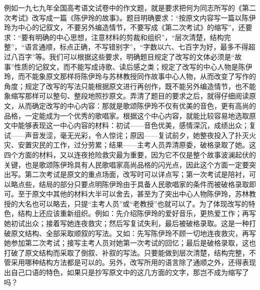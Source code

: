 例如一九七九年全国高考语文试卷中的作文题，就是要求把何为同志所写的《第二次考试》改写成一篇《陈伊玲的故事》。题目明确要求：“按原文内容写一篇以陈伊玲为中心的记叙文，不要另外编造情节，不要写成《第二次考试》的缩写”，还要求：“要有明确的中心思想，注意材料的剪裁和组织”，“层次清楚，结构完整”，“语言通顺，标点正确，不写错别字”，“字数以六、七百字为好，最多不得超过八百字”等。我们可以根据这些要求，明确题目规定了改写的文体必须是“故事”性质的记叙文，而不能写成诗歌、读后感之类；规定了改写的中心人物是陈伊玲，而不能象原文那样将陈伊玲与苏林教授同作故事中心人物，从而改变了写作的角度；规定了改写的写法只能根据原文进行再创作，既不能另外编造情节，也不能象缩写那样可以整句、整段地照抄原文。弄清了题目的要求之后，就得仔细阅读原文，从而确定改写的中心内容：那就是歌颂陈伊玲不仅有优美的音色，更有高尚的品格，一定能成为一个优秀的歌唱家。根据这个中心内容，就能比较容易地选取原文中能够表现这一中心内容的材料：初试——音色优美，感情深沉，成绩出众；复试——声音发涩，毫无光彩，令人惊诧；原因——复试前夕，她整夜投入了扑灭火灾、安置灾民的工作，过分劳累；结果——主考人员弄清原委，破格录取了她。这四个方面的材料，又以连夜抢险救灾最为重要，因为它不仅是整个故事波澜起伏的关键，也是歌颂陈伊玲具有人民歌唱家高尚品格的闪光点，因此这个方面一定要突出写。第二次考试是原文的重点场面，改写时可以详点写；第一次考试是陪衬，可以略点些，结局的部分只要点明陈伊玲由于具备人民歌唱家的条件而被破格录取即可。至于原文中其他的材料大半可以舍去，甚至为了突出中心人物陈伊玲，苏林教授的大名也可以略去，只提“主考人员”或“老教授”也就可以了。为了体现改写的特色，结构上还应该重新组织。例如：先介绍陈伊玲的爱好音乐，更热爱工作；再写她初试出众；接着写她连夜救灾；然后写复试失利，最后被破格录取。这是一种打破原文结构、全部采取顺叙的写法。又如：先写陈伊玲不顾一切地连夜救灾，再写她参加第二次考试；接写主考人员对她第一次考试的回忆；最后是破格录取，这也打破了原文结构而采取了倒叙、补叙的写法。只要能做到层次清楚，结构完整，不管采用哪种结构方法都是可以的。另外，改写所用的语言除了通顺之外，还得表现出自己口语的特色，如果只是抄写原文中的这几方面的文字，那岂不成为缩写了吗？
\newpage